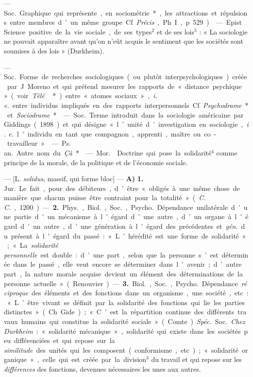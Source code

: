 \begin{itemize}[leftmargin=1cm, label=, itemsep=1pt]
 — \si{Soc.} Graphique qui représente, en sociométrie*, les
attractions et répulsions entre membres d’un même groupe. Cf.
{\it Précis}, Ph. I, p. 529).

 — Epist. Science positive de la vie sociale, de ses types$^2$
et de ses lois$^5$ : « La sociologie ne pouvait apparaître avant qu’on n’eût
acquis le sentiment que les sociétés sont soumises à des lois » (Durkheim).

 — \si{Soc.} Forme de recherches sociologiques (ou plutôt
interpsychologiques) créée par J. Moreno et qui prétend mesurer les rapports
de « distance psychique » (voir {\it Tèlé}\,*) entre « atomes sociaux »,
{\it i. e.} entre individus impliqués en des rapports interpersonnels. Cf.
{\it Psychodrame}* et {\it Sociodrame}*.

 — \si{Soc.} Terme introduit dans la sociologie américaine par
Giddings (1898) et qui désigne « l’unité d'investigation en sociologie,
{\it i. e.}
l'individu en tant que compagnon, apprenti, maître ou co-travailleur ».

 — \si{Ps. an.} Autre nom du {\it Çà}*.

 — \si{Mor.}  Doctrine qui pose la
solidarité$^4$ comme principe de la morale, de la politique et de l’économie
sociale.

 — [L. {\it solidus}, massif, qui forme bloc] — {\bf A)}
 {\bf 1.} \si{Jur.} Le fait, pour des débiteurs, d’être «
obligés à une même chose de manière que chacun puisse être contraint pour la
totalité » ({\it C. C.}, 1200). — {\bf 2.} \si{Phys.}, \si{Biol.}, \si{Soc.},
\si{Psycho.} Dépendance unilatérale d'une partie d'un mécanisme à l'égard
d’une autre, d’un organe à l'égard d'un autre, d’une génération à l'égard des
précédentes et {\it gén.} du présent à l'égard du passé : « L'hérédité est
une forme de solidarité »; « La {\it solidarité personnelle} est double :
d’une part, selon que la personne s’est déterminée dans le passé, elle veut
encore se déterminer dans l'avenir; ... d’autre part, la nature morale acquise
devient un élément des déterminations de la personne actuelle » (Renouvier).
— {\bf 3.} \si{Biol.}, \si{Soc.}, \si{Psycho.} Dépendance {\it réciproque}
des éléments et des fonctions dans un organisme, une société, etc. : « L’être
vivant se définit par la solidarité des fonctions qui lie les parties
distinctes » (Ch. Gide) ; « C’est la répartition continue des différents
travaux humains qui constitue la solidarité sociale » (Comte). {\it Spéc.}
\si{Soc.} {\it Chez Durkheim} : « solidarité mécanique », solidarité qui
existe dans les sociétés peu différenciées et qui repose sur la {\it
similitude} des unités qui les composent (conformisme, etc.) ; « solidarité
organique », celle qui est créée par la division$^3$ du travail et qui repose
sur les {\it différences} des fonctions,
devenues nécessaires les unes aux autres.


\end{itemize}
